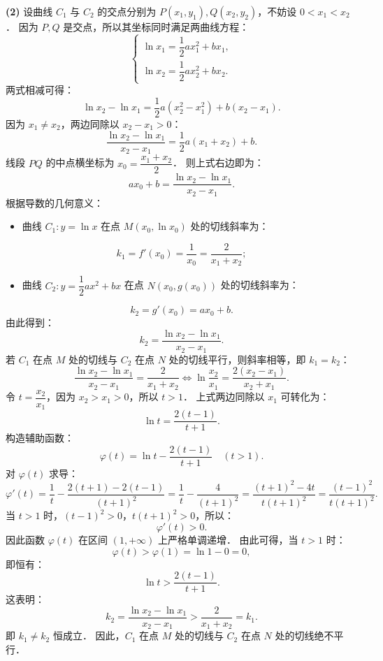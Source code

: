 \begin{answer}
\textbf{(2)}
设曲线 $C_1$ 与 $C_2$ 的交点分别为 $P(x_1, y_1), Q(x_2, y_2)$，不妨设 $0 < x_1 < x_2$．
因为 $P, Q$ 是交点，所以其坐标同时满足两曲线方程：
\nopagebreak[4]
\[
\begin{cases}
\ln x_1 = \dfrac{1}{2}ax_1^2 + bx_1, \\
\ln x_2 = \dfrac{1}{2}ax_2^2 + bx_2.
\end{cases}
\]
两式相减可得：
\nopagebreak[4]
\[
\ln x_2 - \ln x_1 = \frac{1}{2}a(x_2^2 - x_1^2) + b(x_2 - x_1).
\]
因为 $x_1 \neq x_2$，两边同除以 $x_2 - x_1 > 0$：
\nopagebreak[4]
\[
\frac{\ln x_2 - \ln x_1}{x_2 - x_1} = \frac{1}{2}a(x_1 + x_2) + b.
\]
线段 $PQ$ 的中点横坐标为 $x_0 = \dfrac{x_1 + x_2}{2}$．
则上式右边即为：
\nopagebreak[4]
\[
ax_0 + b = \frac{\ln x_2 - \ln x_1}{x_2 - x_1}.
\]
根据导数的几何意义：
\begin{itemize}
\item 曲线 $C_1: y = \ln x$ 在点 $M(x_0, \ln x_0)$ 处的切线斜率为：
\end{itemize}
\nopagebreak[4]
\[
k_1 = f'(x_0) = \frac{1}{x_0} = \frac{2}{x_1 + x_2};
\]
\begin{itemize}
\item 曲线 $C_2: y = \dfrac{1}{2}ax^2 + bx$ 在点 $N(x_0, g(x_0))$ 处的切线斜率为：
\end{itemize}
\nopagebreak[4]
\[
k_2 = g'(x_0) = ax_0 + b.
\]
由此得到：
\nopagebreak[4]
\[
k_2 = \frac{\ln x_2 - \ln x_1}{x_2 - x_1}.
\]
若 $C_1$ 在点 $M$ 处的切线与 $C_2$ 在点 $N$ 处的切线平行，则斜率相等，即 $k_1 = k_2$：
\nopagebreak[4]
\[
\frac{\ln x_2 - \ln x_1}{x_2 - x_1} = \frac{2}{x_1 + x_2} \iff \ln\frac{x_2}{x_1} = \frac{2(x_2 - x_1)}{x_2 + x_1}.
\]
令 $t = \dfrac{x_2}{x_1}$，因为 $x_2 > x_1 > 0$，所以 $t > 1$．
上式两边同除以 $x_1$ 可转化为：
\nopagebreak[4]
\[
\ln t = \frac{2(t - 1)}{t + 1}.
\]
构造辅助函数：
\nopagebreak[4]
\[
\varphi(t) = \ln t - \frac{2(t - 1)}{t + 1} \quad (t > 1).
\]
对 $\varphi(t)$ 求导：
\nopagebreak[4]
\[
\varphi'(t) = \frac{1}{t} - \frac{2(t + 1) - 2(t - 1)}{(t + 1)^2} = \frac{1}{t} - \frac{4}{(t + 1)^2} = \frac{(t + 1)^2 - 4t}{t(t + 1)^2} = \frac{(t - 1)^2}{t(t + 1)^2}.
\]
当 $t > 1$ 时，$(t - 1)^2 > 0$，$t(t + 1)^2 > 0$，所以：
\nopagebreak[4]
\[
\varphi'(t) > 0.
\]
因此函数 $\varphi(t)$ 在区间 $(1, +\infty)$ 上严格单调递增．
由此可得，当 $t > 1$ 时：
\nopagebreak[4]
\[
\varphi(t) > \varphi(1) = \ln 1 - 0 = 0,
\]
即恒有：
\nopagebreak[4]
\[
\ln t > \frac{2(t - 1)}{t + 1}.
\]
这表明：
\nopagebreak[4]
\[
k_2 = \frac{\ln x_2 - \ln x_1}{x_2 - x_1} > \frac{2}{x_1 + x_2} = k_1.
\]
即 $k_1 \neq k_2$ 恒成立．
因此，$C_1$ 在点 $M$ 处的切线与 $C_2$ 在点 $N$ 处的切线绝不平行．



\end{answer}